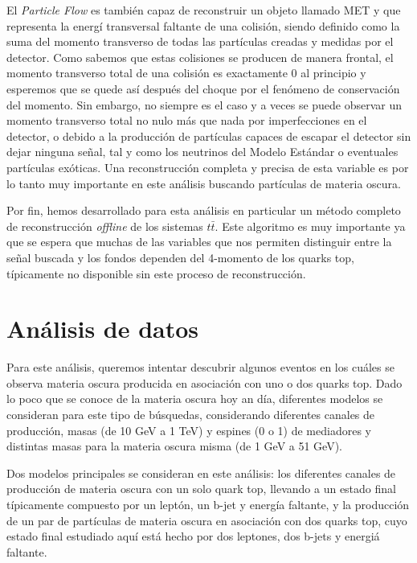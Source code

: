 \documentclass[a4paper, 10pt, openright]{report}
\begin{document}
\begin{appendices}
El \textit{Particle Flow} es tambi\'{e}n capaz de reconstruir un objeto llamado \ac{MET} y que representa la energ\'{i} transversal faltante de una colisi\'{o}n, siendo definido como la suma del momento transverso de todas las part\'{i}culas creadas y medidas por el detector. Como sabemos que estas colisiones se producen de manera frontal, el momento transverso total de una colisi\'{o}n es exactamente 0 al principio y esperemos que se quede as\'{i} despu\'{e}s del choque por el fen\'{o}meno de conservaci\'{o}n del momento. Sin embargo, no siempre es el caso y a veces se puede observar un momento transverso total no nulo m\'{a}s que nada por imperfecciones en el detector, o debido a la producci\'{o}n de part\'{i}culas capaces de escapar el detector sin dejar ninguna se\~{n}al, tal y como los neutrinos del Modelo Est\'{a}ndar o eventuales part\'{i}culas ex\'{o}ticas. Una reconstrucci\'{o}n completa y precisa de esta variable es por lo tanto muy importante en este an\'{a}lisis buscando part\'{i}culas de materia oscura.

Por fin, hemos desarrollado para esta an\'{a}lisis en particular un m\'{e}todo completo de reconstrucci\'{o}n \textit{offline} de los sistemas $t \bar t$. Este algoritmo es muy importante ya que se espera que muchas de las variables que nos permiten distinguir entre la se\~{n}al buscada y los fondos dependen del 4-momento de los quarks top, t\'{i}picamente no disponible sin este proceso de reconstrucci\'{o}n.

\section{An\'{a}lisis de datos}

Para este an\'{a}lisis, queremos intentar descubrir algunos eventos en los cu\'{a}les se observa materia oscura producida en asociaci\'{o}n con uno o dos quarks top. Dado lo poco que se conoce de la materia oscura hoy an d\'{i}a, diferentes modelos se consideran para este tipo de b\'{u}squedas, considerando diferentes canales de producci\'{o}n, masas (de 10 GeV a 1 TeV) y espines (0 o 1) de mediadores y distintas masas para la materia oscura misma (de 1 GeV a 51 GeV).

Dos modelos principales se consideran en este an\'{a}lisis: los diferentes canales de producci\'{o}n de materia oscura con un solo quark top, llevando a un estado final t\'{i}picamente compuesto por un lept\'{o}n, un b-jet y energ\'{i}a faltante, y la producci\'{o}n de un par de part\'{i}culas de materia oscura en asociaci\'{o}n con dos quarks top, cuyo estado final estudiado aqu\'{i} est\'{a} hecho por dos leptones, dos b-jets y energi\'{a} faltante.


\end{appendices}
\end{document}
